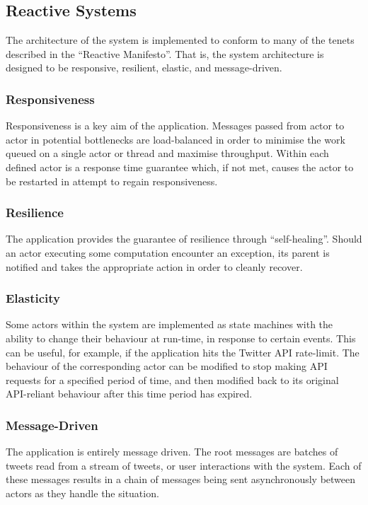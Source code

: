 \documentclass{l4proj}
\begin{document}
        \subsection{Reactive Systems}
        The architecture of the system is implemented to conform to many of the tenets described in the ``Reactive Manifesto''. That is, the system architecture is designed to be responsive, resilient, elastic, and message-driven.
        
            \subsubsection{Responsiveness}
            Responsiveness is a key aim of the application. Messages passed from actor to actor in potential bottlenecks are load-balanced in order to minimise the work queued on a single actor or thread and maximise throughput. Within each defined actor is a response time guarantee which, if not met, causes the actor to be restarted in attempt to regain responsiveness. 
            
            \subsubsection{Resilience}
            The application provides the guarantee of resilience through ``self-healing''. Should an actor executing some computation encounter an exception, its parent is notified and takes the appropriate action in order to cleanly recover.
            
            \subsubsection{Elasticity}
            Some actors within the system are implemented as state machines with the ability to change their behaviour at run-time, in response to certain events. This can be useful, for example, if the application hits the Twitter API rate-limit. The behaviour of the corresponding actor can be modified to stop making API requests for a specified period of time, and then modified back to its original API-reliant behaviour after this time period has expired.
            
            \subsubsection{Message-Driven}
            The application is entirely message driven. The root messages are batches of tweets read from a stream of tweets, or user interactions with the system. Each of these messages results in a chain of messages being sent asynchronously between actors as they handle the situation.
\end{document}
